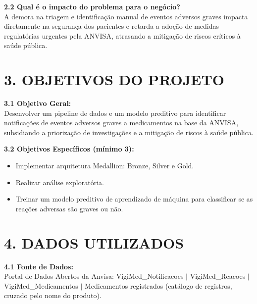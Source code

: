 \documentclass[11pt, a4paper]{article}
\begin{document}
\vspace{6pt}
\textbf{2.2 Qual é o impacto do problema para o negócio?}\\
{\small A demora na triagem e identificação manual de eventos adversos graves impacta diretamente na segurança dos pacientes e retarda a adoção de medidas regulatórias urgentes pela ANVISA, atrasando a mitigação de riscos críticos à saúde pública.}

\vspace{6pt}
\section*{3. OBJETIVOS DO PROJETO}

\textbf{3.1 Objetivo Geral:}\\
{\small Desenvolver um pipeline de dados e um modelo preditivo para identificar notificações de eventos adversos graves a medicamentos na base da ANVISA, subsidiando a priorização de investigações e a mitigação de riscos à saúde pública.}

\vspace{6pt}
\textbf{3.2 Objetivos Específicos (mínimo 3):}
\begin{itemize}
    \item Implementar arquitetura Medallion: Bronze, Silver e Gold.
    \item Realizar análise exploratória.
    \item Treinar um modelo preditivo de aprendizado de máquina para classificar se as reações adversas são graves ou não.
\end{itemize}

\vspace{6pt}
\section*{4. DADOS UTILIZADOS}

\textbf{4.1 Fonte de Dados:}\\
{\small Portal de Dados Abertos da Anvisa: VigiMed\_Notificacoes $|$ VigiMed\_Reacoes $|$ VigiMed\_Medicamentos $|$ Medicamentos registrados (catálogo de registros, cruzado pelo nome do produto).}
\end{document}
